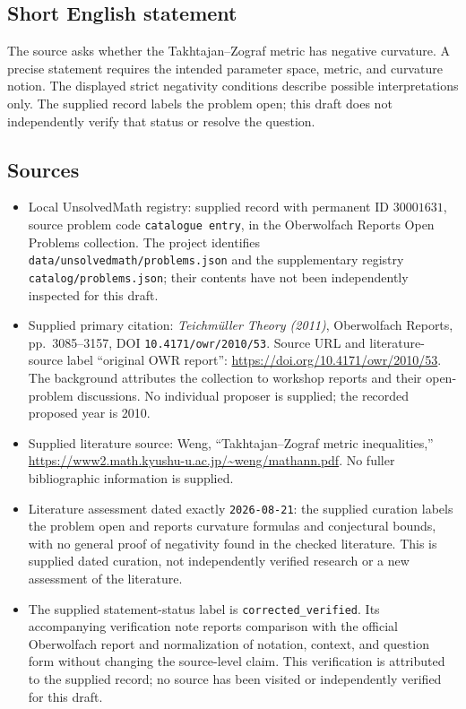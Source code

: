 \documentclass[11pt]{article}
\begin{document}
\subsection{Short English statement}
The source asks whether the Takhtajan--Zograf metric has negative curvature. A precise statement requires the intended parameter space, metric, and curvature notion. The displayed strict negativity conditions describe possible interpretations only. The supplied record labels the problem open; this draft does not independently verify that status or resolve the question.
\subsection{Sources}
\begin{itemize}
\item Local UnsolvedMath registry: supplied record with permanent ID \(30001631\), source problem code \texttt{catalogue entry}, in the Oberwolfach Reports Open Problems collection. The project identifies \texttt{data/unsolvedmath/problems.json} and the supplementary registry \texttt{catalog/problems.json}; their contents have not been independently inspected for this draft.
\item Supplied primary citation: \emph{Teichm\"uller Theory (2011)}, Oberwolfach Reports, pp.~3085--3157, DOI \texttt{10.4171/owr/2010/53}. Source URL and literature-source label ``original OWR report'': \url{https://doi.org/10.4171/owr/2010/53}. The background attributes the collection to workshop reports and their open-problem discussions. No individual proposer is supplied; the recorded proposed year is 2010.
\item Supplied literature source: Weng, ``Takhtajan--Zograf metric inequalities,'' \url{https://www2.math.kyushu-u.ac.jp/~weng/mathann.pdf}. No fuller bibliographic information is supplied.
\item Literature assessment dated exactly \texttt{2026-08-21}: the supplied curation labels the problem open and reports curvature formulas and conjectural bounds, with no general proof of negativity found in the checked literature. This is supplied dated curation, not independently verified research or a new assessment of the literature.
\item The supplied statement-status label is \texttt{corrected\_verified}. Its accompanying verification note reports comparison with the official Oberwolfach report and normalization of notation, context, and question form without changing the source-level claim. This verification is attributed to the supplied record; no source has been visited or independently verified for this draft.
\end{itemize}
\end{document}
